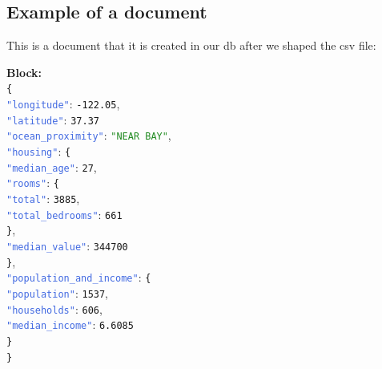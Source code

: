 \documentclass{Configuration_Files/PoliMi3i_thesis}
\newcommand{\jsonkey}[1]{\textcolor{RoyalBlue}{\texttt{"#1"}}}
\newcommand{\jsonstring}[1]{\textcolor{ForestGreen}{\texttt{"#1"}}}
\newcommand{\jsonnumber}[1]{\textcolor{BrickRed}{\texttt{#1}}}
\begin{document}
\subsection{Example of a document}
This is a document that it is created in our db after we shaped the csv file:

\textbf{Block:}\\
\noindent
\texttt{\{} \\
\jsonkey{longitude}: \jsonnumber{-122.05}, \\
\jsonkey{latitude}: \jsonnumber{37.37} \\
\jsonkey{ocean\_proximity}: \jsonstring{NEAR BAY},\\
\jsonkey{housing}: \texttt{\{} \\
\hspace*{1em} \jsonkey{median\_age}: \jsonnumber{27}, \\
\hspace*{1em} \jsonkey{rooms}: \texttt{\{} \\
\hspace*{2em} \jsonkey{total}: \jsonnumber{3885}, \\
\hspace*{2em} \jsonkey{total\_bedrooms}: \jsonnumber{661} \\
\hspace*{1em} \texttt{\}}, \\
\hspace*{1em} \jsonkey{median\_value}: \jsonnumber{344700} \\
\texttt{\}}, \\
\jsonkey{population\_and\_income}: \texttt{\{} \\
\hspace*{1em} \jsonkey{population}: \jsonnumber{1537}, \\
\hspace*{1em} \jsonkey{households}: \jsonnumber{606}, \\
\hspace*{1em} \jsonkey{median\_income}: \jsonnumber{6.6085} \\
\texttt{\}} \\
\texttt{\}}
\end{document}
